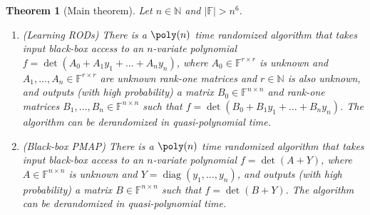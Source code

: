 \documentclass[11pt,letterpaper]{article}
\DeclareMathOperator*{\diag}{diag}
\newcommand{\F}{\mathbb{F}}
\newtheorem{theorem}{Theorem}[section]
\newcommand{\N}{\mathbb{N}}
\begin{document}
\begin{theorem}[Main theorem] \label{thm:main}
Let $n \in \N$ and $|\F| > n^6$. 
\begin{enumerate}
\item \emph{(Learning RODs)} There is a $\poly(n)$ time randomized algorithm that takes input black-box access to an $n$-variate polynomial $f = \det(A_0 + A_1y_1 + \ldots + A_ny_n)$, where $A_0 \in \F^{r \times r}$ is unknown and $A_1, \ldots, A_n \in \F^{r \times r}$ are unknown rank-one matrices and $r\in \N$ is also unknown, and outputs (with high probability) a matrix $B_0 \in \F^{n\times n}$ and rank-one matrices $B_1, \ldots, B_n \in \F^{n \times n}$ such that $f = \det(B_0 + B_1y_1 + \ldots + B_ny_n)$. The algorithm can be derandomized in quasi-polynomial time.

\item \emph{(Black-box PMAP)} There is a $\poly(n)$ time randomized algorithm that takes input black-box access to an $n$-variate polynomial $f = \det(A + Y)$, where $A \in \F^{n \times n}$ is unknown and $Y = \diag(y_1, \ldots, y_n)$, and outputs (with high probability) a matrix $B \in \F^{n\times n}$ such that $f = \det(B + Y)$. The algorithm can be derandomized in quasi-polynomial time.
\end{enumerate}
\end{theorem}
\end{document}
